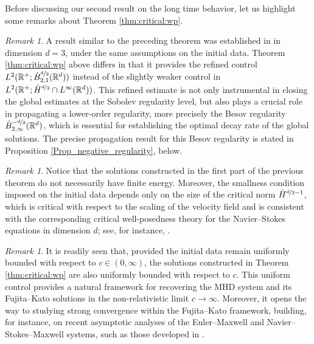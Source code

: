 \documentclass[11pt, leqno, a4paper,]{amsart}
\theoremstyle{remark}
\newtheorem{remark}[theorem]{Remark}
\numberwithin{equation}{section}
\begin{document}
Before  discussing our second result on the long time behavior, let us highlight some remarks about Theorem \ref{thm:critical:wp}.
 
\begin{remark}
A result similar to the preceding theorem was established in \cite{GIM14} in dimension $d=3$, under the same assumptions on the initial data. Theorem \ref{thm:critical:wp} above differs in that it provides the refined control $ L^2 (\mathbb {R}^+; \dot B^{\nicefrac{d}{2} }_{2,1} (\mathbb R^d))$ instead of the slightly weaker control in $ L^2 (\mathbb {R}^+; \dot H^{\nicefrac{d}{2} } \cap L^\infty (\mathbb R^d))$.
	This refined estimate is not only instrumental in closing the global estimates at the   Sobolev regularity level, but also plays a crucial role in propagating a lower-order regularity, more precisely the Besov regularity $\dot B^{-\nicefrac{d}{2}}_{2,\infty}(\mathbb R^d)$, which is essential for establishing the optimal decay rate of the global solutions. The precise propagation result for this Besov regularity is stated in Proposition \ref{Prop_negative_regularity}, below.
	\end{remark} 
	
	
	
\begin{remark}
Notice that the solutions constructed in the first part of the previous theorem do not necessarily have finite energy. Moreover, the smallness condition imposed on the initial data depends only on the size of the critical norm $\dot H^{\nicefrac{d}{2}-1}$, which is critical with respect to the scaling of the velocity field and is consistent with the corresponding critical well-posedness theory for the Navier--Stokes equations in dimension $d$; see, for instance, \cite{Fujita_1964, X24}.
\end{remark}

\begin{remark}
It is readily seen that, provided the initial data remain uniformly bounded with respect to $c\in(0,\infty)$, the solutions constructed in Theorem \ref{thm:critical:wp} are also uniformly bounded with respect to $c$. This uniform control provides a natural framework for recovering the MHD system and its Fujita--Kato solutions in the non-relativistic limit $c\to\infty$. Moreover, it opens the way to studying strong convergence within the Fujita--Kato framework, building, for instance, on recent asymptotic analyses of the Euler--Maxwell and Navier--Stokes--Maxwell systems, such as those developed in \cite{ahh24, ah2, KKL26}.
\end{remark}
\end{document}
